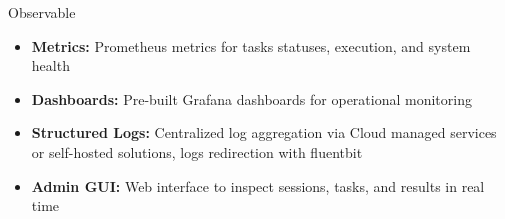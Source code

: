 \begin{frame}{Observable}
	\begin{itemize}
		\item \textbf{Metrics:} Prometheus metrics for tasks statuses, execution, and system health
		\item \textbf{Dashboards:} Pre-built Grafana dashboards for operational monitoring
		\item \textbf{Structured Logs:} Centralized log aggregation via Cloud managed services or self-hosted solutions, logs redirection with fluentbit
		\item \textbf{Admin GUI:} Web interface to inspect sessions, tasks, and results in real time
	\end{itemize}
\end{frame}





